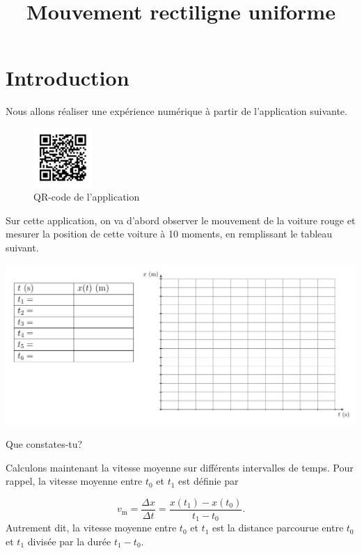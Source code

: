 \documentclass[
  letterpaper,
  DIV=11,
  numbers=noendperiod]{scrartcl}
\title{Mouvement rectiligne uniforme}
\author{}
\date{}
\theoremstyle{definition}
\theoremstyle{definition}
\theoremstyle{remark}
\begin{document}
\maketitle


\section{Introduction}\label{introduction}

Nous allons réaliser une expérience numérique à partir de l'application
suivante.

\begin{figure}[H]

{\centering \includegraphics[width=0.2\textwidth,height=\textheight]{figures/mru/mru-1.pdf}

}

\caption{QR-code de l'application}

\end{figure}%

Sur cette application, on va d'abord observer le mouvement de la voiture
rouge et mesurer la position de cette voiture à 10 moments, en
remplissant le tableau suivant.

\includegraphics[width=1\textwidth,height=\textheight]{figures/mru/fig2.pdf}

Que constates-tu? \newpage

Calculons maintenant la vitesse moyenne sur différents intervalles de
temps. Pour rappel, la vitesse moyenne entre \(t_0\) et \(t_1\) est
définie par

\[
v_{\text{m}}=\dfrac{\Delta x}{\Delta t}=\dfrac{x(t_1)-x(t_0)}{t_1-t_0}.
\] Autrement dit, la vitesse moyenne entre \(t_0\) et \(t_1\) est la
distance parcourue entre \(t_0\) et \(t_1\) divisée par la durée
\(t_1-t_0\).
\end{document}
